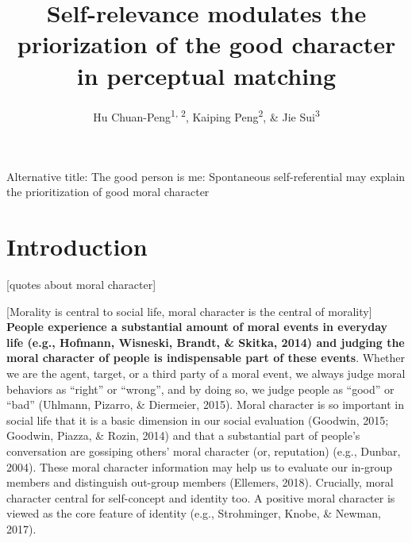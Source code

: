 \documentclass[
  man]{apa6}
\title{Self-relevance modulates the priorization of the good character in perceptual matching}
\author{Hu Chuan-Peng\textsuperscript{1, 2}, Kaiping Peng\textsuperscript{2}, \& Jie Sui\textsuperscript{3}}
\date{}
\affiliation{\vspace{0.5cm}\textsuperscript{1} Nanjing Normal University, 210024 Nanjing, China\\\textsuperscript{2} Tsinghua University, 100084 Beijing, China\\\textsuperscript{3} University of Aberdeen, Aberdeen, Scotland}
\begin{document}
\maketitle

Alternative title: The good person is me: Spontaneous self-referential may explain the prioritization of good moral character

\hypertarget{introduction}{%
\section{Introduction}\label{introduction}}

{[}quotes about moral character{]}

{[}Morality is central to social life, moral character is the central of morality{]} \textbf{People experience a substantial amount of moral events in everyday life (e.g., Hofmann, Wisneski, Brandt, \& Skitka, 2014) and judging the moral character of people is indispensable part of these events}. Whether we are the agent, target, or a third party of a moral event, we always judge moral behaviors as ``right'' or ``wrong'', and by doing so, we judge people as ``good'' or ``bad'' (Uhlmann, Pizarro, \& Diermeier, 2015). Moral character is so important in social life that it is a basic dimension in our social evaluation (Goodwin, 2015; Goodwin, Piazza, \& Rozin, 2014) and that a substantial part of people's conversation are gossiping others' moral character (or, reputation) (e.g., Dunbar, 2004). These moral character information may help us to evaluate our in-group members and distinguish out-group members (Ellemers, 2018). Crucially, moral character central for self-concept and identity too. A positive moral character is viewed as the core feature of identity (e.g., Strohminger, Knobe, \& Newman, 2017).
\end{document}
